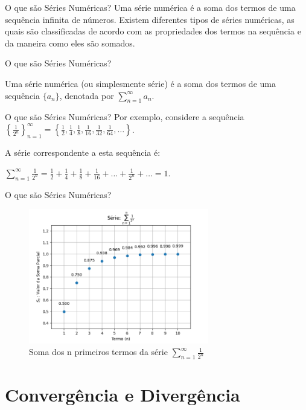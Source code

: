 \documentclass[brazil]{beamer}
\begin{document}
	\begin{frame}{O que são Séries Numéricas?}
		\justifying
		Uma série numérica é a soma dos termos de uma sequência infinita de números.
		Existem diferentes tipos de séries numéricas, as quais são classificadas de
		acordo com as propriedades dos termos na sequência e da maneira como eles são
		somados.
	\end{frame}
	\begin{frame}{O que são Séries Numéricas?}
		\begin{definition}[1]
			Uma série numérica (ou simplesmente série) é a soma dos termos de uma sequência $\{a_n\}$, denotada por $\displaystyle\sum_{n=1}^{\infty} a_n$.
		\end{definition}
	\end{frame}
	\begin{frame}{O que são Séries Numéricas?}
		Por exemplo, considere a sequência
		$\left\{\frac{1}{2^n}\right\}_{n=1}^{\infty}=\left\{\frac{1}{2}, \frac{1}{4},
		\frac{1}{8}, \frac{1}{16}, \frac{1}{32}, \frac{1}{64}, \dots\right\}$.
		
		A série correspondente a esta sequência é:
		
		\centering
		$\displaystyle\sum_{n=1}^{\infty}
		\frac{1}{2^n} = \frac{1}{2} + \frac{1}{4} + \frac{1}{8} + \frac{1}{16} + \dots
		+ \frac{1}{2^n} + \dots = 1$.
	\end{frame}
	\begin{frame}{O que são Séries Numéricas?}
		\begin{figure}
			\centering
			\includegraphics[width=0.7\textwidth]{../images/serie_1.png}
			\caption{Soma dos n primeiros termos da série  $  \displaystyle\sum_{n=1}^{\infty} \frac{1}{2^n}$}
		\end{figure}
	\end{frame}
	
	\section{Convergência e Divergência}
	\begin{frame}
		\tableofcontents[currentsection]
	\end{frame}
	
\end{document}
